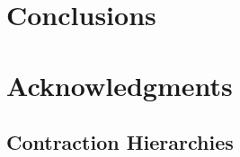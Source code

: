 \documentclass{vldb}
\begin{document}
\section{Conclusions}


\balance

\section{Acknowledgments}


 


\begin{appendix}

\section{Contraction Hierarchies}


\end{appendix}
\end{document}
